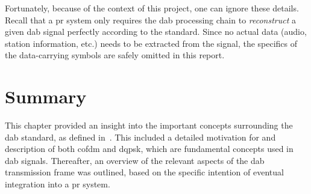\documentclass[class=report,11pt,crop=false]{standalone}
\begin{document}
Fortunately, because of the context of this project, one can ignore these details. Recall that a \gls{pr} system only requires the \gls{dab} processing chain to \emph{reconstruct} a given \gls{dab} signal perfectly according to the standard. Since no actual data (audio, station information, etc.) needs to be extracted from the signal, the specifics of the data-carrying symbols are safely omitted in this report.

\section{Summary}
This chapter provided an insight into the important concepts surrounding the \gls{dab} standard, as defined in~\cite{dabstandard}. This included a detailed motivation for and description of both \gls{cofdm} and \gls{dqpsk}, which are fundamental concepts used in \gls{dab} signals. Thereafter, an overview of the relevant aspects of the \gls{dab} transmission frame was outlined, based on the specific intention of eventual integration into a \gls{pr} system.

\ifstandalone

\printnoidxglossary[type=\acronymtype, nonumberlist]
\fi
\end{document}
